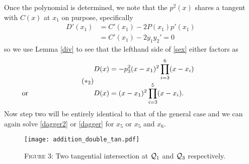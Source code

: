 \documentclass[english,11pt,a4paper]{article}
\begin{document}
\begin{case}
  Once the polynomial is determined, we note that the $p^2(x)$ shares a tangent with $C(x)$ at $x_1$ on purpose, specifically
  \begin{align*}
    D'(x_1) &= C'(x_1) - 2 P(x_1)p'(x_1)\\
            &= C'(x_1) - 2 y_1 y_2' = 0
  \end{align*}
  so we use Lemma \ref{div} to see that the lefthand side of \eqref{sex} either factors as
  \begin{align} \tag{$*_2$} \begin{split}
    D(x) &= -p_3^2(x-x_1)^2 \prod_{i=3}^6(x-x_i)\\
    \rlap{\hspace{-37mm} or}
    D(x) &= (x-x_1)^2 \prod_{i=3}^5(x-x_i).
  \end{split} \end{align}
  Now step two will be entirely identical to that of the general case and we can again solve \eqref{dagger2} or \eqref{dagger} for $x_5$ or $x_5$ and $x_6$.
\end{case}

\begin{figure}[ht]
  \fline
  \begin{center}
    \vspace{1mm}
    \texttt{[image: addition\_double\_tan.pdf]}

    {\scshape Figure 3}: Two tangential intersection at $\mathcal{Q}_1$ and $\mathcal{Q}_3$ respectively.
  \end{center}
  \vspace{-1.5mm}
  \fline
\end{figure}
\end{document}
